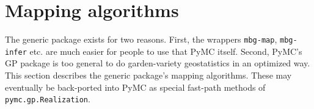 \chapter{Mapping algorithms}

The generic package exists for two reasons. First, the wrappers \texttt{mbg-map}, \texttt{mbg-infer} etc. are much easier for people to use that PyMC itself. Second, PyMC's GP package is too general to do garden-variety geostatistics in an optimized way. This section describes the generic package's mapping algorithms. These may eventually be back-ported into PyMC as special fast-path methods of \texttt{pymc.gp.Realization}.